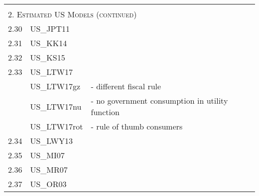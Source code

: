 \documentclass[11pt,a4paper]{article}
\begin{document}
\begin{table}[H]
\begin{tabularx}{\textwidth}{lll}
			&&\\	
			\hline \hline
		\end{tabularx} 
	\end{table}
	
	\vspace{-1cm}
	
	\begin{table}[H]
		\begin{tabularx}{\textwidth}{lll}
			\hline \hline
			&& \\
			\multicolumn{3}{l}{\textsc{2. Estimated US Models (continued)}} \\
			2.30	&	US\_JPT11	&	\cite{Justinianoetal2011}\\	
			2.31	&	US\_KK14	&	\cite{kliem2014kriwoluzky}	\\								
			2.32	&	US\_KS15	&	\cite{kriwoluzky2015stoltenberg}	\\								
			2.33	&	US\_LTW17	&	\cite{leeper2017traum}	\\								
			&	US\_LTW17gz &	\cite{leeper2017traum} - different fiscal rule\\		
						&	US\_LTW17nu &	\cite{leeper2017traum} - no government consumption in utility function\\											
			&	US\_LTW17rot &	\cite{leeper2017traum} - rule of thumb consumers\\											
			
			2.34	&	US\_LWY13	&	\cite{leeper2013fiscal}\\									
			2.35\footnotemark[1]	&	US\_MI07	&	\cite{Milani2007}\\%
			2.36	&	US\_MR07	&	\cite{MankiwReis2007}	\\								
			2.37\footnotemark[1]	&	US\_OR03	&	\cite{Orphanides2003}\\%
			

\end{tabularx}
\end{table}
\end{document}
